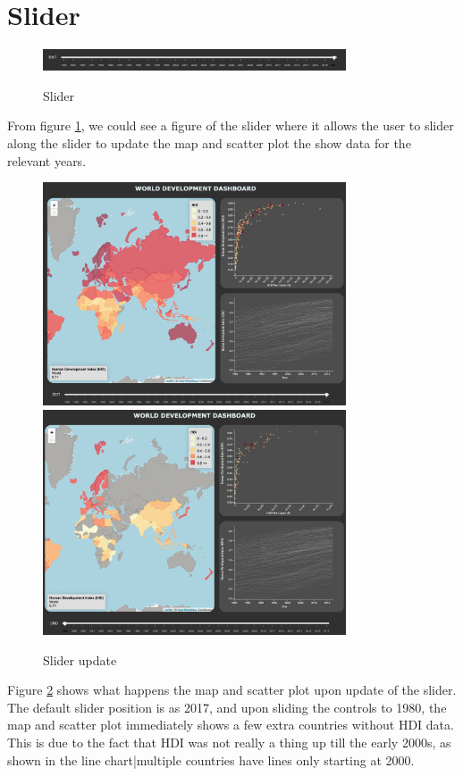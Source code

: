 \documentclass{scrreprt}
\begin{document}
\section{Slider}
\begin{figure}[H]
    \centering
    \includegraphics[width = 0.8\textwidth]{images/slider.png}
    \label{fig:slider}
    \caption{Slider}
\end{figure}
From figure \ref{fig:slider}, we could see a figure of the slider where it allows the user to slider along the slider to update the map and scatter plot the show data for the relevant years.
\begin{figure}[H]
    \centering
    \includegraphics[width = 0.8\textwidth]{images/slider_2.png}
    \includegraphics[width = 0.8\textwidth]{images/slider_1.png}
    \label{fig:slider-update}
    \caption{Slider update}
\end{figure}
Figure \ref{fig:slider-update} shows what happens the  map and scatter plot upon update of the slider. The default slider position is as 2017, and upon sliding the controls to 1980, the map and scatter plot immediately shows a few extra countries without HDI data. This is due to the fact that HDI was not really a thing up till the early 2000s, as shown in the line chart|multiple countries have lines only starting at 2000. \\
\end{document}
